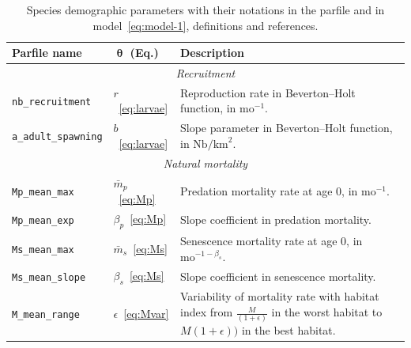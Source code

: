 
\begin{table}[H]
\caption{Species demographic parameters with their notations in the parfile and in model~\ref{eq:model-1}, definitions and references.}
  \begin{tabular}{p{3.6cm}p{1.5cm}p{10.25cm}}\hline
   \textbf{Parfile name} & $\boldsymbol \uptheta$	(\textbf{Eq.}) & \textbf{Description}	\\\hline 
     \multicolumn{3}{c}{\textit{Recruitment}} \\
    \hline
    \texttt{nb\_recruitment} & $r$~\eqref{eq:larvae} & {Reproduction rate in Beverton--Holt function, in $\text{mo}^{-1}$.}\\
    \texttt{a\_adult\_spawning} & $b$~\eqref{eq:larvae} & {Slope parameter in Beverton--Holt function, in $\text{Nb}/\text{km}^2$.}\\\hline
     \multicolumn{3}{c}{\textit{Natural mortality}}\\
    \hline
    \texttt{Mp\_mean\_max}& $\bar{m}_p$~\eqref{eq:Mp} & {Predation mortality rate at age $0$, in $\text{mo}^{-1}$.}\\

    \texttt{Mp\_mean\_exp}& $\beta_p$~\eqref{eq:Mp} & {Slope coefficient in predation mortality.} \\

    \texttt{Ms\_mean\_max}& $\bar{m}_s$~\eqref{eq:Ms} & {Senescence mortality rate at age $0$, in $\text{mo}^{-1-\beta_s}$.}\\

    \texttt{Ms\_mean\_slope} & $\beta_s$~\eqref{eq:Ms}  & Slope coefficient in senescence mortality.\\

    \texttt{M\_mean\_range} & $\epsilon$~\eqref{eq:Mvar} & {Variability of mortality rate with habitat index from $\frac{M}{(1+\epsilon)}$ in the worst habitat to $M(1+\epsilon))$ in the best habitat.} \\\hline
%
  \end{tabular}
\label{tab:demography-xml}  
\end{table}

